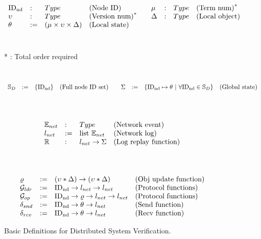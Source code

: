 \begin{figure}
\begin{small}
\raggedright

\noindent{}\\
$$
\begin{array}{lllllllll}
\mathrm{ID_{nd}} &:& Type & \mbox{(Node ID)} & & \mu &:& Type & \mbox{(Term num)}^* \\
\upsilon &:& Type & \mbox{(Version num)}^* & &\Delta &:& Type & \mbox{(Local object)}\\
\theta &:=& (\mu  \times \upsilon \times \Delta) & \mbox{(Local state)} & & & & & \\
\end{array}
$$
\\
\raggedleft

* : Total order required

\raggedright
\noindent{}\\
$$
\begin{array}{lllllllll}
\fullset &:=& \set{\nodeid} & \mbox{(Full node ID set)} & & \gstate &:=& \set{ \nodeid \mapsto \dstate ~\vert~ \forall \nodeid \in \fullset} & \mbox{(Global state)}\\
\end{array}
$$
\\
\noindent{} \\
$$
\begin{array}{llll}
\packet &: & Type & \mbox{(Network event)}\\
\networklog &:=& \mbox{list}\ \packet & \mbox{(Network log)}\\
\replay &:& \networklog \rightarrow  \gstate& \mbox{(Log replay function)}\\
\end{array}
$$
\\
\noindent{}  \\
$$
\begin{array}{llll}
	\updatefunc & := & (\seqnum * \dsvalue) \rightarrow   (\seqnum * \dsvalue)  &
	\mbox{(Obj update function)} \\
\gldrfunction & := & \nodeid \rightarrow \networklog \rightarrow \networklog  & \mbox{(Protocol functions)} \\
\gopfunction & := & \nodeid \rightarrow \updatefunc \rightarrow \networklog \rightarrow \networklog  & \mbox{(Protocol functions)} \\

\sendfunction & := & \nodeid \rightarrow \dstate \rightarrow \networklog & \mbox{(Send function)}\\
\recvfunction & := & \nodeid \rightarrow \dstate \rightarrow \networklog & \mbox{(Recv function)}\\
\end{array}
$$
\end{small}
\caption{Basic Definitions for Distributed System Verification.}
\label{fig:chapter:witnesspassing:basic-state}
\end{figure}

